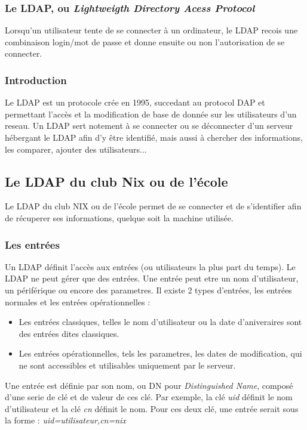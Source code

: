 \subsubsection{Le LDAP, ou \textit{Lightweigth Directory Acess Protocol}}

Lorsqu'un utilisateur tente de se connecter à un ordinateur, le LDAP recois une combinaison login/mot de passe et donne ensuite ou non l'autorisation de se connecter.


\subsubsection{Introduction}

Le LDAP est un protocole crée en 1995, succedant au protocol DAP et permettant l'accès et la modification de base de donnée sur les utilisateurs d'un reseau. Un LDAP sert notement à se connecter ou se déconnecter d'un serveur hébergant le LDAP afin d'y être identifié, mais aussi à chercher des informations, les comparer, ajouter des utilisateurs...
\subsection{Le LDAP du club Nix ou de l'école}
Le LDAP du club NIX ou de l'école permet de se connecter et de s'identifier afin de récuperer ses informations, quelque soit la machine utilisée.


\subsubsection{Les entrées}

Un LDAP définit l'accès aux entrées (ou utilisateurs la plus part du temps).
Le LDAP ne peut gérer que des entrées. Une entrée peut etre un nom d'utilisateur, un périférique ou encore des parametres. Il existe 2 types d'entrées, les entrées normales et les entrées opérationnelles :
\begin{itemize}
    \item Les entrées classiques, telles le nom d'utilisateur ou la date d'aniveraires sont des entrées dites classiques.
    \item Les entrées opérationnelles, tels les parametres, les dates de modification, qui ne sont accessibles et utilisables uniquement par le serveur.
\end{itemize}
Une entrée est définie par son nom, ou DN pour \textit{Distinguished Name}, composé d'une serie de clé et de valeur de ces clé. Par exemple, la clé \textit{uid} définit le nom d'utilisateur et la clé \textit{cn} définit le nom. Pour ces deux clé, une entrée serait sous la forme : \textit{uid=utilisateur,cn=nix}


